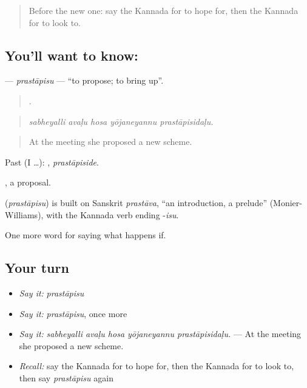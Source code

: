 \label{lesson:KA-C429-prastapisu}



\begin{quote}
Before the new one: say the Kannada for to hope for, then the Kannada for to look to.
\end{quote}

\subsection*{You'll want to know: }
\textbf{} — \emph{prastāpisu} — \textquotedblleft{}to propose; to bring up\textquotedblright{}.

\begin{quote}
    .
\end{quote}

\begin{quote}
\emph{sabheyalli avaḷu hosa yōjaneyannu prastāpisidaḷu.}
\end{quote}

\begin{quote}
At the meeting she proposed a new scheme.
\end{quote}

Past (I …): , \emph{prastāpiside}.

, a proposal.

\begin{cousinweb}
\textbf{} (\emph{prastāpisu}) is built on Sanskrit \emph{prastāva}, \textquotedblleft{}an introduction, a prelude\textquotedblright{} (Monier-Williams), with the Kannada verb ending -\emph{isu}.
\end{cousinweb}

\begin{grammarlens}[title={What you've built}]
One more word for saying what happens if.
\end{grammarlens}

\subsection*{Your turn}
\begin{itemize}
\raggedright
  \item \emph{Say it:} \emph{prastāpisu}
  \item \emph{Say it:} \emph{prastāpisu}, once more
  \item \emph{Say it:} \emph{sabheyalli avaḷu hosa yōjaneyannu prastāpisidaḷu.} — At the meeting she proposed a new scheme.
  \item \emph{Recall:} say the Kannada for to hope for, then the Kannada for to look to, then say \emph{prastāpisu} again
\end{itemize}

